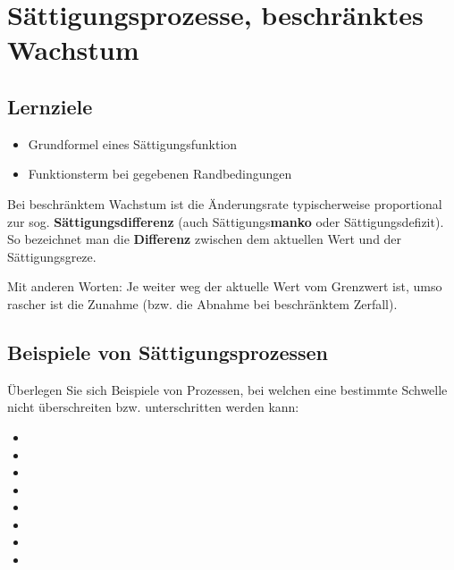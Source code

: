 \section{Sättigungsprozesse, beschränktes Wachstum}

\subsection*{Lernziele}
\begin{itemize}
	\item Grundformel eines Sättigungsfunktion
  \item Funktionsterm bei gegebenen Randbedingungen 
\end{itemize}

Bei beschränktem Wachstum ist die Änderungsrate typischerweise
proportional zur
sog. \textbf{Sättigungsdifferenz}
(auch Sättigungs\textbf{manko} oder Sättigungsdefizit).
  So bezeichnet man die \textbf{Differenz} zwischen dem
  aktuellen Wert und der Sättigungsgreze.

Mit anderen Worten: Je weiter weg der aktuelle Wert vom Grenzwert ist, umso rascher ist die Zunahme (bzw. die Abnahme bei beschränktem Zerfall).

\newpage


\subsection{Beispiele von Sättigungsprozessen}
Überlegen Sie sich Beispiele von Prozessen, bei welchen eine bestimmte Schwelle nicht überschreiten bzw. unterschritten werden kann:
\begin{itemize}
	\item {}
	\item {}
	\item {}
	\item {}
	\item {}
	\item {}
        \item {}
        \item \Lueckentext{\dotfill}
\end{itemize}
\newpage


